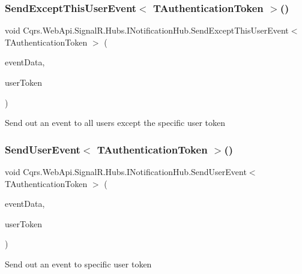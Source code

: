 \subsubsection{\texorpdfstring{Send\+Except\+This\+User\+Event$<$ T\+Authentication\+Token $>$()}{SendExceptThisUserEvent< TAuthenticationToken >()}}
{\footnotesize\ttfamily void Cqrs.\+Web\+Api.\+Signal\+R.\+Hubs.\+I\+Notification\+Hub.\+Send\+Except\+This\+User\+Event$<$ T\+Authentication\+Token $>$ (\begin{DoxyParamCaption}\item[{\hyperlink{interfaceCqrs_1_1Events_1_1IEvent}{I\+Event}$<$ T\+Authentication\+Token $>$}]{event\+Data,  }\item[{string}]{user\+Token }\end{DoxyParamCaption})}



Send out an event to all users except the specific user token 

\mbox{\label{interfaceCqrs_1_1WebApi_1_1SignalR_1_1Hubs_1_1INotificationHub_a88cb05c6807058bfe2bff48427a45ad2}} 
\subsubsection{\texorpdfstring{Send\+User\+Event$<$ T\+Authentication\+Token $>$()}{SendUserEvent< TAuthenticationToken >()}}
{\footnotesize\ttfamily void Cqrs.\+Web\+Api.\+Signal\+R.\+Hubs.\+I\+Notification\+Hub.\+Send\+User\+Event$<$ T\+Authentication\+Token $>$ (\begin{DoxyParamCaption}\item[{\hyperlink{interfaceCqrs_1_1Events_1_1IEvent}{I\+Event}$<$ T\+Authentication\+Token $>$}]{event\+Data,  }\item[{string}]{user\+Token }\end{DoxyParamCaption})}



Send out an event to specific user token 

